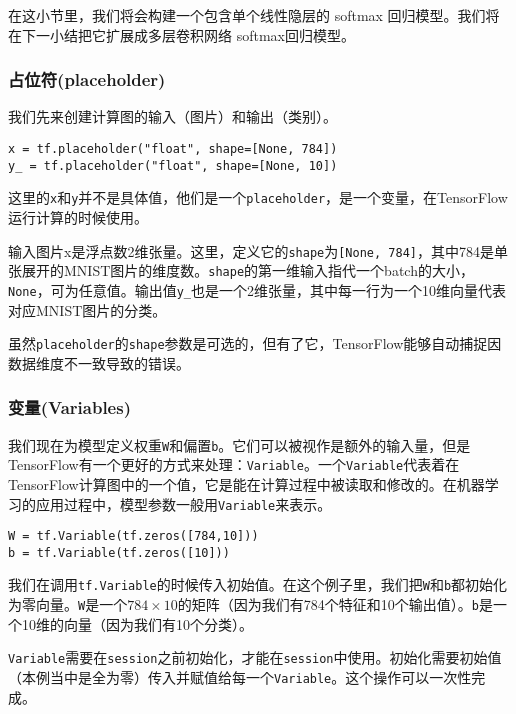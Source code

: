 在这小节里，我们将会构建一个包含单个线性隐层的 softmax 回归模型。我们将在下一小结把它扩展成多层卷积网络 softmax回归模型。

\subsubsection{占位符(placeholder)}
我们先来创建计算图的输入（图片）和输出（类别）。

\begin{lstlisting}
x = tf.placeholder("float", shape=[None, 784])
y_ = tf.placeholder("float", shape=[None, 10])
\end{lstlisting}

这里的\lstinline{x}和\lstinline{y}并不是具体值，他们是一个\lstinline{placeholder}，是一个变量，在TensorFlow运行计算的时候使用。

输入图片x是浮点数2维张量。这里，定义它的\lstinline{shape}为\lstinline{[None, 784]}，其中784是单张展开的MNIST图片的维度数。\lstinline{shape}的第一维输入指代一个batch的大小，\lstinline{None}，可为任意值。输出值\lstinline{y_}也是一个2维张量，其中每一行为一个10维向量代表对应MNIST图片的分类。

虽然\lstinline{placeholder}的\lstinline{shape}参数是可选的，但有了它，TensorFlow能够自动捕捉因数据维度不一致导致的错误。

\subsubsection{变量(Variables)}

我们现在为模型定义权重\lstinline{W}和偏置\lstinline{b}。它们可以被视作是额外的输入量，但是TensorFlow有一个更好的方式来处理：\lstinline{Variable}。一个\lstinline{Variable}代表着在TensorFlow计算图中的一个值，它是能在计算过程中被读取和修改的。在机器学习的应用过程中，模型参数一般用\lstinline{Variable}来表示。

\begin{lstlisting}
W = tf.Variable(tf.zeros([784,10]))
b = tf.Variable(tf.zeros([10]))
\end{lstlisting}

我们在调用\lstinline{tf.Variable}的时候传入初始值。在这个例子里，我们把\lstinline{W}和\lstinline{b}都初始化为零向量。\lstinline{W}是一个$784\times10$的矩阵（因为我们有784个特征和10个输出值）。\lstinline{b}是一个10维的向量（因为我们有10个分类）。

\lstinline{Variable}需要在\lstinline{session}之前初始化，才能在\lstinline{session}中使用。初始化需要初始值（本例当中是全为零）传入并赋值给每一个\lstinline{Variable}。这个操作可以一次性完成。

